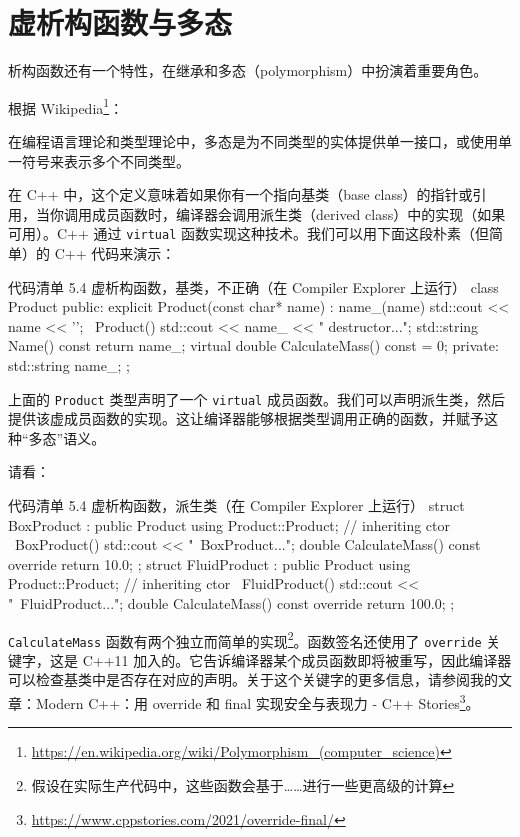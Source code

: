 \section{虚析构函数与多态}

析构函数还有一个特性，在继承和多态（polymorphism）中扮演着重要角色。

根据 Wikipedia\footnote{\url{https://en.wikipedia.org/wiki/Polymorphism_(computer_science)}}：

\begin{myQuote}
在编程语言理论和类型理论中，多态是为不同类型的实体提供单一接口，或使用单一符号来表示多个不同类型。
\end{myQuote}

在 C++ 中，这个定义意味着如果你有一个指向基类（base class）的指针或引用，当你调用成员函数时，编译器会调用派生类（derived class）中的实现（如果可用）。C++ 通过 \texttt{virtual} 函数实现这种技术。我们可以用下面这段朴素（但简单）的 C++ 代码来演示：

\begin{codeboxt}[cpp]{代码清单 5.4 虚析构函数，基类，不正确（在 Compiler Explorer 上运行）}
class Product {
public:
explicit Product(const char* name) : name_(name) {
std::cout << name << '\n';
}
~Product() { std::cout << name_ << " destructor...\n"; }
std::string Name() const { return name_; }
virtual double CalculateMass() const = 0;
private:
std::string name_;
};
\end{codeboxt}

上面的 \texttt{Product} 类型声明了一个 \texttt{virtual} 成员函数。我们可以声明派生类，然后提供该虚成员函数的实现。这让编译器能够根据类型调用正确的函数，并赋予这种“多态”语义。

请看：

\begin{codeboxt}[cpp]{代码清单 5.4 虚析构函数，派生类（在 Compiler Explorer 上运行）}
struct BoxProduct : public Product {
using Product::Product; // inheriting ctor
~BoxProduct() { std::cout << "~BoxProduct...\n"; }
double CalculateMass() const override { return 10.0; }
};
struct FluidProduct : public Product {
using Product::Product; // inheriting ctor
~FluidProduct() { std::cout << "~FluidProduct...\n"; }
double CalculateMass() const override { return 100.0; }
};
\end{codeboxt}

\texttt{CalculateMass} 函数有两个独立而简单的实现\footnote{假设在实际生产代码中，这些函数会基于……进行一些更高级的计算}。函数签名还使用了 \texttt{override} 关键字，这是 C++11 加入的。它告诉编译器某个成员函数即将被重写，因此编译器可以检查基类中是否存在对应的声明。关于这个关键字的更多信息，请参阅我的文章：Modern C++：用 override 和 final 实现安全与表现力 - C++ Stories\footnote{\url{https://www.cppstories.com/2021/override-final/}}。


